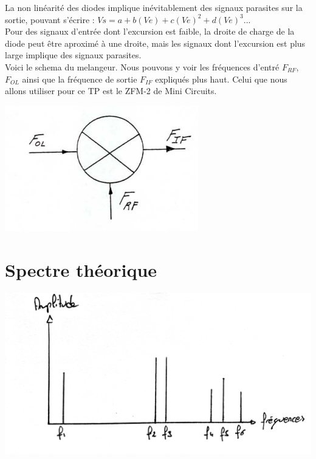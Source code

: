 \documentclass[a4paper,12pt]{report}            %
\begin{document}
    La non linéarité des diodes implique inévitablement des signaux parasites sur la sortie,
pouvant s'écrire : $Vs = a + b(Ve) + c(Ve)^{2} + d(Ve)^{3} ...$\\
    Pour des signaux d'entrée dont l'excursion est faible, la  droite de charge de la diode peut 
être aproximé à une droite, mais les signaux dont l'excursion est plus large implique des signaux parasites.\\
    Voici le schema du melangeur. Nous pouvons y voir les fréquences d'entré $F_{RF}$, $F_{OL}$ ainsi que la
fréquence de sortie $F_{IF}$ expliqués plus haut. Celui que nous allons utiliser pour ce TP est le ZFM-2 de Mini Circuits.\\
\begin{center}\includegraphics[scale = 0.4]{pic/mixer_logo.png}\\ \end{center}

\section{Spectre théorique}

\begin{center}\includegraphics[scale = 0.3]{pic/Spectre_theorique.png}\\ \end{center}
\end{document}
